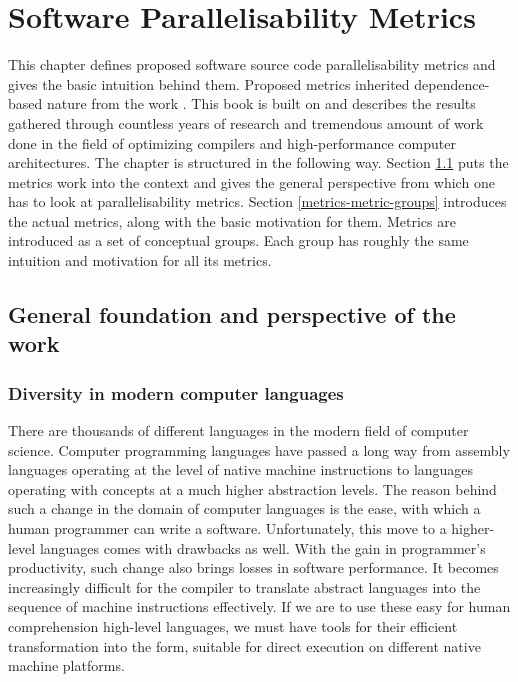 \chapter{Software Parallelisability Metrics} \label{metrics}
\qquad This chapter defines proposed software source code parallelisability metrics and gives the basic intuition behind them. Proposed metrics inherited dependence-based nature from the work \cite{optimizing-compilers-book}. This book is built on and describes the results gathered through countless years of research and tremendous amount of work done in the field of optimizing compilers and high-performance computer architectures. \newline\null\qquad The chapter is structured in the following way. Section \ref{metrics-foundation-and-perspective} puts the metrics work into the context and gives the general perspective from which one has to look at parallelisability metrics. Section \ref{metrics-metric-groups} introduces the actual metrics, along with the basic motivation for them. Metrics are introduced as a set of conceptual groups. Each group has roughly the same intuition and motivation for all its metrics.  

\section{General foundation and perspective of the work} \label{metrics-foundation-and-perspective}

\subsection{Diversity in modern computer languages}
\label{metrics-diversity-in-modern-computer-languages}
\qquad There are thousands of different languages in the modern field of computer science. Computer programming languages have passed a long way from assembly languages operating at the level of native machine instructions to languages operating with concepts at a much higher abstraction levels. The reason behind such a change in the domain of computer languages is the ease, with which a human programmer can write a software. \newline
\null\qquad Unfortunately, this move to a higher-level languages comes with drawbacks as well. With the gain in programmer's productivity, such change also brings losses in software performance. It becomes increasingly difficult for the compiler to translate abstract languages into the sequence of machine instructions effectively. \newline
\null\qquad If we are to use these easy for human comprehension high-level languages, we must have tools for their efficient transformation into the form, suitable for direct execution on different native machine platforms.

